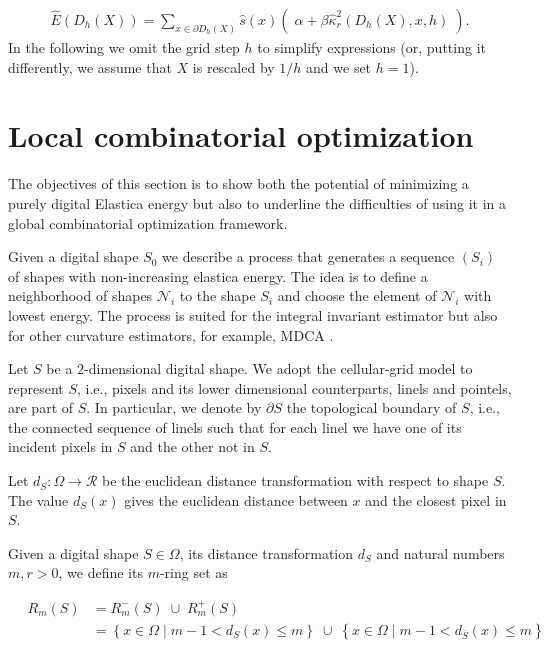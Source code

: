 \documentclass[runningheads]{llncs}
\begin{document}
\begin{align}
	\hat{E}( D_h(X) ) = \sum_{x \in \partial D_h(X)}{ \hat{s}(x)\left(\; \alpha + \beta \hat{\kappa}_{r}^2(D_h(X),x,h) \; \right)}.
	\label{eq:digital-energy}
\end{align}
 In the following we omit the grid step $h$ to simplify expressions (or, putting it differently, we assume that $X$ is rescaled by $1/h$ and we set $h=1$).

\section{Local combinatorial optimization}

The objectives of this section is to show both the potential of minimizing a purely digital Elastica energy but also to underline the difficulties of using it in a global combinatorial optimization framework.

Given a digital shape $S_0$ we describe a process that generates a sequence $(S_i)$ of shapes with non-increasing
elastica energy. The idea is to define a neighborhood of shapes
$\mathcal{N}_i$ to the shape $S_i$ and choose the element of
$\mathcal{N}_i$ with lowest energy.  The process is suited for the
integral invariant estimator but also for other curvature estimators,
for example, MDCA \cite{roussillon11mdca}.

Let $S$ be a $2$-dimensional digital shape. We adopt the cellular-grid model to represent $S$, i.e., pixels and its lower dimensional counterparts, linels and pointels, are part of $S$. In particular, we denote by $\partial S$ the topological boundary of $S$, i.e., the connected sequence of linels such that for each linel we have one of its incident pixels in $S$ and the other not in $S$.


Let $d_{S}:\Omega \rightarrow \mathcal{R}$ be the euclidean distance transformation with respect to shape $S$. The value $d_S(x)$ gives the euclidean distance between $x$ and the closest pixel in $S$. 

\begin{definition}
Given a digital shape $S\in\Omega$, its distance transformation $d_S$ and natural numbers $m,r > 0$, we define its $m$-ring set as

\begin{align*}
	\quad R_m(S) &= R_m^-(S) \; \cup \; R_m^+(S) \\
	&= \left\{ x \in \Omega \; | \; m-1 < d_S(x) \leq m \right\} \; \cup \;  \left\{ x \in \Omega \; | \; 	m-1 < d_{\overline{S}}(x) \leq m \right\}\\
\end{align*}

\end{definition}
\end{document}
